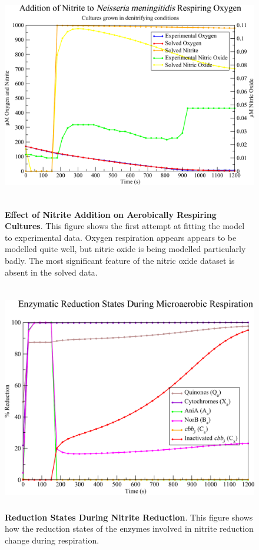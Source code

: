 \begin{figure}[tbp]
 \centering
 \includegraphics[height=10cm, clip=true]{./07-nitritereduction/data/dataset2-1.pdf}
 \caption[Effect of Nitrite Addition on Aerobically Respiring Cultures]{{\bf Effect of Nitrite Addition on Aerobically Respiring Cultures}. This figure shows the first attempt at fitting the model to experimental data. Oxygen respiration appears appears to be modelled quite well, but nitric oxide is being modelled particularly badly. The most significant feature of the nitric oxide dataset is absent in the solved data.
  \label{fig:nitrite_ds2_solved1}}
\end{figure}

\begin{figure}[tbp]
 \centering
 \includegraphics[height=10cm, clip=true]{./07-nitritereduction/data/dataset2redox-1.pdf}
 \caption[Reduction States During Nitrite Reduction]{{\bf Reduction States During Nitrite Reduction}. This figure shows how the reduction states of the enzymes involved in nitrite reduction change during respiration.
  \label{fig:nitrite_ds2_redox1}}
\end{figure}

